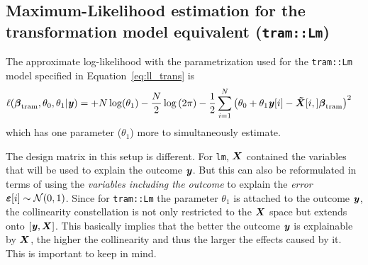 \documentclass[11pt,a4paper,twoside]{book}\usepackage[]{graphicx}\usepackage[]{xcolor}
\begin{document}
\subsection{Maximum-Likelihood estimation for the transformation model equivalent (\texttt{tram::Lm})}\label{sec:mltramLM}

The approximate log-likelihood with the parametrization used for the \texttt{tram::Lm} model specified in Equation~\eqref{eq:ll_trans} is
\begin{align}
\ell({\boldsymbol{\beta}}_\text{tram},\theta_0,\theta_1|{\textbf{\textit{y}}})&=+N\log(\theta_1)-\frac{N}{2}\log\left(2\pi\right)-\frac{1}{2}\sum_{i=1}^N\left(\theta_0+\theta_1 {\textbf{\textit{y}}}[i]-\boldsymbol{\tilde{X}}[i,]{\boldsymbol{\beta}}_\text{tram}\right)^2
\label{eq:ll_tramLm}
\end{align}
which has one parameter ($\theta_1$) more to simultaneously estimate.

The design matrix in this setup is different. For \texttt{lm}, ${\boldsymbol{X}}$ contained the variables that will be used to explain the outcome ${\textbf{\textit{y}}}$. But this can also be reformulated in terms of using the \textit{variables including the outcome} to explain the  \textit{error} ${\boldsymbol{\varepsilon}}[i]\sim \operatorname{\mathcal{N}}(0,1)$.
Since for \texttt{tram::Lm} the parameter $\theta_1$ is attached to the outcome ${\textbf{\textit{y}}}$, the collinearity constellation is not only restricted to the ${\boldsymbol{X}}$ space but extends onto $\left[{\textbf{\textit{y}}},{\boldsymbol{X}}\right]$.
This basically implies that the better the outcome ${\textbf{\textit{y}}}$ is explainable by ${\boldsymbol{X}}$, the higher the collinearity and thus the larger the effects caused by it. This is important to keep in mind.
\end{document}
